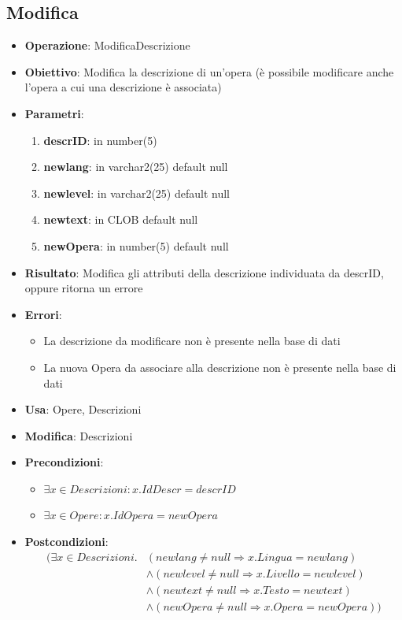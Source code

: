 \subsection{Modifica}
\begin{itemize}
	\item \textbf{Operazione}: ModificaDescrizione
	\item \textbf{Obiettivo}: Modifica la descrizione di un'opera (è possibile modificare anche l'opera a cui una descrizione è associata)
	\item \textbf{Parametri}:
	\begin{enumerate}
		\item \textbf{descrID}: in number(5)
		\item \textbf{newlang}: in varchar2(25) default null
		\item \textbf{newlevel}: in varchar2(25) default null
		\item \textbf{newtext}: in CLOB default null
		\item \textbf{newOpera}: in number(5) default null
	\end{enumerate}
	\item \textbf{Risultato}: Modifica gli attributi della descrizione individuata da descrID, oppure ritorna un errore
	\item \textbf{Errori}: 
	\begin{itemize}
		\item La descrizione da modificare non è presente nella base di dati
		\item La nuova Opera da associare alla descrizione non è presente nella base di dati
	\end{itemize}
	\item \textbf{Usa}: Opere, Descrizioni
	\item \textbf{Modifica}: Descrizioni
	\item \textbf{Precondizioni}:
	\begin{itemize}
		\item $\exists x \in Descrizioni : x.IdDescr = descrID$
		\item $\exists x \in Opere : x.IdOpera = newOpera$
	\end{itemize}
	\item \textbf{Postcondizioni}:
	\begin{align*} (\exists x \in Descrizioni.
		& (newlang \ne null \Rightarrow x.Lingua = newlang) \\
		& \land (newlevel \ne null \Rightarrow x.Livello = newlevel) \\
		& \land (newtext \ne null \Rightarrow x.Testo = newtext) \\
		& \land (newOpera \ne null \Rightarrow x.Opera = newOpera))
	\end{align*}
\end{itemize}
